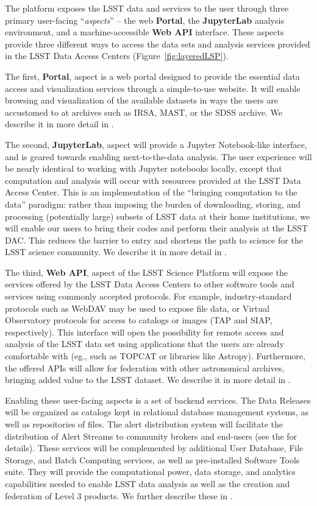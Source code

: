 \documentclass[DM,lsstdraft,toc]{lsstdoc}
\begin{document}
The platform exposes the LSST data
and services to the user through three primary user-facing ``\textit{aspects}'' -- the web \textbf{Portal},
the \textbf{JupyterLab} analysis environment, and a machine-accessible \textbf{Web API} interface. These aspects provide three different ways to access the data sets and analysis services provided in the LSST Data Access Centers (Figure~\ref{fig:layeredLSP}).

The first, \textbf{Portal}, aspect is a web portal designed to provide the essential data
access and visualization services through a simple-to-use website.  It will
enable browsing and visualization of the available datasets in ways the
users are accustomed to at archives such as IRSA, MAST, or the SDSS archive.
We describe it in more detail in .

The second, \textbf{JupyterLab}, aspect will provide a Jupyter Notebook-like interface, and
is geared towards enabling next-to-the-data analysis. The user experience will
be nearly identical to working with Jupyter notebooks locally, except that computation
and analysis will occur with resources provided at the LSST Data Access Center.  This is an
implementation of the “bringing computation to the data” paradigm: rather
than imposing the burden of downloading, storing, and processing (potentially large)
subsets of LSST data at their home institutions, we will enable our users to
bring their codes and perform their analysis at the LSST DAC.
This reduces the barrier to entry and shortens the path to science for
the LSST science community. We describe it in more detail in .

The third, \textbf{Web API}, aspect of the LSST Science Platform will expose the
services offered by the LSST Data Access Centers to other software tools and
services using commonly accepted protocols. For example, industry-standard
protocols such as WebDAV may be used to expose file data, or Virtual Observatory
protocols for access to catalogs or images (TAP and SIAP, respectively). This interface will open the
possibility for remote access and analysis of the LSST  data set using
applications that the users are already comfortable with (eg., such as TOPCAT
or libraries like Astropy). Furthermore, the offered APIs will allow for federation
with other astronomical archives, bringing added value to the LSST dataset.
We describe it in more detail in .

Enabling these user-facing aspects is a set of backend services. The Data Releases will be organized as catalogs kept in relational database management systems, as well as repositories of files. The alert distribution system will facilitate the distribution of Alert Streams to community brokers and end-users (see the \DPDD for details). These services will be complemented by additional User Database, File Storage, and Batch Computing services, as well as pre-installed Software Tools suite. They will provide the computational power, data storage, and analytics capabilities needed to enable LSST data analysis as well as the creation and federation of Level 3 products. We further describe these in .
\end{document}
